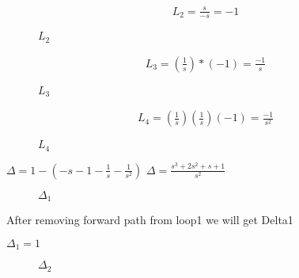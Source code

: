 \begin{enumerate}[label=\thesection.\arabic*.,ref=\thesection.\theenumi]
\begin{align}
L_2=\frac{s}{-s}=-1
\end{align}

\begin{figure}[!ht]
\begin{center}
		
		\resizebox{\columnwidth}{!}{}
	\end{center}
\caption{$L_2$}
\label{fig:sec_order}
\end{figure}


\begin{align}
L_3=(\frac{1}{s})*(-1)=\frac{-1}{s}
\end{align}

\begin{figure}[!ht]
\begin{center}
		
		\resizebox{\columnwidth}{!}{}
	\end{center}
\caption{$L_3$}
\label{fig:sec_order}
\end{figure}


\begin{align}
L_4=(\frac{1}{s})(\frac{1}{s})(-1)=\frac{-1}{s^2}
\end{align}

\begin{figure}[!ht]
\begin{center}
		
		\resizebox{\columnwidth}{!}{}
	\end{center}
\caption{$L_4$}
\label{fig:sec_order}
\end{figure}


$\Delta = 1-(-s-1-\frac{1}{s}-\frac{1}{s^2})$
$\Delta = \frac{s^3+2s^2+s+1}{s^2}$

\begin{figure}[!ht]
\begin{center}
		
		\resizebox{\columnwidth}{!}{}
	\end{center}
\caption{$\Delta_1$}
\label{fig:sec_order}
\end{figure}

After removing forward path from loop1 we will get Delta1

$\Delta_1 = 1$

\begin{figure}[!ht]
\begin{center}
		
		\resizebox{\columnwidth}{!}{}
	\end{center}
\caption{$\Delta_2$}
\label{fig:sec_order}
\end{figure}


\end{enumerate}
